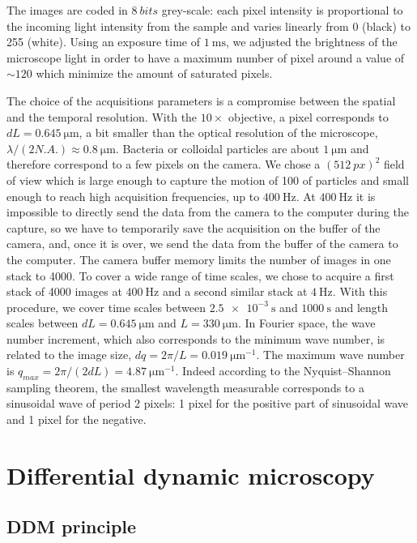\documentclass[prb,reprint,amsmath,amssymb]{revtex4-1}
\begin{document}
The images are coded in $\SI{8}{bits}$  grey-scale: each pixel intensity is proportional to the incoming light intensity from the sample and varies linearly from  0 (black) to 255 (white). Using an exposure time of $\SI{1}{\milli\second}$, we adjusted the brightness of the microscope light in order to have a maximum number of pixel around a value of $\sim 120$ which minimize the amount of saturated pixels.

The choice of the acquisitions parameters is a compromise between the spatial and the temporal resolution. With the $10\times$ objective, a pixel corresponds to $dL=\SI{0.645}{\micro\meter}$, a bit smaller than the optical resolution of the microscope, $\lambda/(2N.A.)\approx\SI{0.8}{\micro\meter} $. Bacteria or colloidal particles are about $\SI{1}{\micro\meter}$ and therefore correspond to a few pixels on the camera. We chose a $(\SI{512}{px})^2$ field of view which is large enough to capture the motion of 100 of particles and small enough to reach high acquisition frequencies, up to $\SI{400}{\hertz}$. At $\SI{400}{\hertz}$ it is impossible to directly send the data from the camera to the computer during the capture, so we have to temporarily save the acquisition on the buffer of the camera, and, once it is over, we send the data from the buffer of the camera to the computer. The camera buffer memory limits the number of images in one stack to 4000. To cover a wide range of time scales, we chose to acquire a first stack of 4000 images at $\SI{400}{\hertz}$ and a second similar stack at $\SI{4}{\hertz}$. With this procedure, we cover time scales between $\SI{2.5e-3}{\second}$ and $\SI{1000}{\second}$ and length scales between $dL=\SI{0.645}{\micro\meter}$ and $L=\SI{330}{\micro\meter}$. In Fourier space, the wave number increment, which also corresponds to the minimum wave number, is related to the image size, $dq=2\pi/L=\SI{0.019}{\micro\meter^{-1}}$. The maximum wave number is $q_{max}=2\pi/(2dL)=\SI{4.87}{\micro\meter^{-1}}$. Indeed according to the Nyquist–Shannon sampling theorem, the smallest wavelength measurable corresponds to a sinusoidal wave of period 2 pixels: 1 pixel for the positive part of sinusoidal wave and 1 pixel for the negative.

\section{Differential dynamic microscopy}
\label{sec:ddm}
\subsection{DDM principle}
\end{document}

